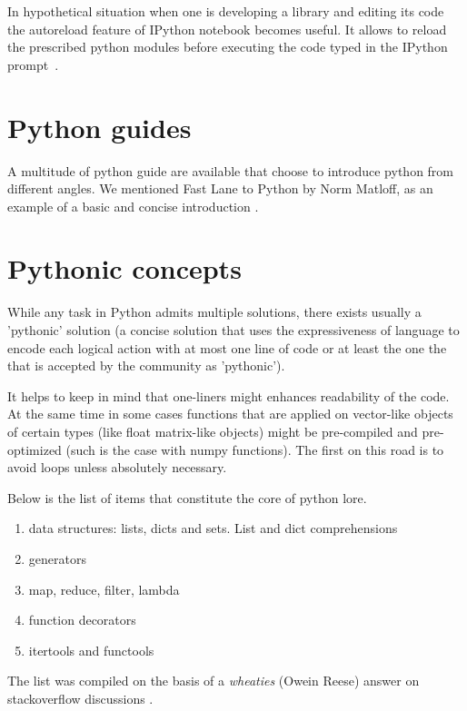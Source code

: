 \documentclass[article]{revtex4}
\begin{document}
In hypothetical situation when one is developing a library and editing its code the autoreload feature of IPython notebook becomes useful. It allows to reload the prescribed python modules before executing the code typed in the IPython prompt~\cite{autoreload}.

\section{Python guides}
A multitude of python guide are available that choose to introduce python from different angles. We mentioned Fast Lane to Python by Norm Matloff, as an example of a basic and concise introduction \cite{fastlane}.

\section{Pythonic concepts}

While any task in Python admits multiple solutions, there exists usually a 'pythonic' solution (a concise solution that uses the expressiveness of language to encode each logical action with at most one line of code or at least the one the that is accepted by the community as 'pythonic').

It helps to keep in mind that one-liners might enhances readability of the code. At the same time in some cases functions that are applied on vector-like objects of certain types (like float matrix-like objects) might be pre-compiled and pre-optimized (such is the case with numpy functions). The first on this road is to avoid loops unless absolutely necessary.

Below is the list of items that constitute the core of python lore.

\begin{enumerate}
    \item data structures: lists, dicts and sets. List and dict comprehensions
    \item generators
    \item map, reduce, filter, lambda
    \item function decorators
    \item itertools and functools
\end{enumerate}

The list was compiled on the basis of a {\it wheaties} (Owein Reese) answer on stackoverflow discussions \cite{progression}.


\end{document}
